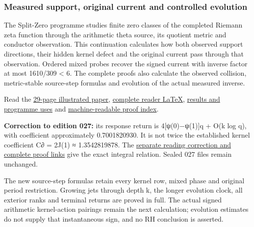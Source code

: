 \documentclass[
]{article}
\begin{document}
\subsubsection{Measured support, original current and controlled
evolution}\label{measured-support-original-current-and-controlled-evolution}

The Split-Zero programme studies finite zero classes of the completed
Riemann zeta function through the arithmetic theta source, its quotient
metric and conductor observation. This continuation calculates how both
observed support directions, their hidden kernel defect and the original
current pass through that observation. Ordered mixed probes recover the
signed current with inverse factor at most 1610/309 \textless{} 6. The
complete proofs also calculate the observed collision, metric-stable
source-step formulas and evolution of the actual measured inverse.

Read the
\href{https://github.com/KokunoYumeto/zeta-function-research-reader/blob/main/workbenches/splitzero-tandem/continuations/20260922-support-transport/SUPPORT_TRANSPORT_READER.pdf}{29-page
illustrated paper},
\href{https://github.com/KokunoYumeto/zeta-function-research-reader/blob/main/workbenches/splitzero-tandem/continuations/20260922-support-transport/SUPPORT_TRANSPORT_READER.tex}{complete
reader LaTeX},
\href{https://github.com/KokunoYumeto/zeta-function-research-reader/blob/main/workbenches/splitzero-tandem/continuations/20260922-support-transport/RESULTS_20260922_028.md}{results
and programme uses} and
\href{https://github.com/KokunoYumeto/zeta-function-research-reader/blob/main/workbenches/splitzero-tandem/continuations/20260922-support-transport/RESULT_INDEX.json}{machine-readable
proof index}.

\textbf{Correction to edition 027:} its response return is
4{[}ψ(0)−ψ(1){]}q + O(k log q), with coefficient approximately
0.7001820930. It is not twice the established kernel coefficient C∂ =
2J(1) ≈ 1.3542819878. The
\href{https://github.com/KokunoYumeto/zeta-function-research-reader/blob/main/workbenches/splitzero-tandem/continuations/20260922-support-transport/CORRECTION_027_RD15.md}{separate
reading correction and complete proof links} give the exact integral
relation. Sealed 027 files remain unchanged.

The new source-step formulas retain every kernel row, mixed phase and
original period restriction. Growing jets through depth k, the longer
evolution clock, all exterior ranks and terminal returns are proved in
full. The actual signed arithmetic kernel-action pairings remain the
next calculation; evolution estimates do not supply that instantaneous
sign, and no RH conclusion is asserted.
\end{document}
